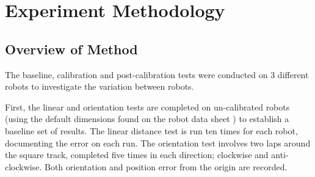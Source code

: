 \documentclass[conference]{IEEEtran}
\begin{document}
        
        

\section{Experiment Methodology}\label{sec:experiment_method}


\subsection{Overview of Method}

The baseline, calibration and post-calibration tests were conducted on 3 different robots to investigate the variation between robots. 

First, the linear and orientation tests are completed on un-calibrated robots (using the default dimensions found on the robot data sheet \cite{}) to establish a baseline set of results. 
The linear distance test is run ten times for each robot, documenting the error on each run. 
The orientation test involves two laps around the square track, completed five times in each direction; clockwise and anti-clockwise.
Both orientation and position error from the origin are recorded.
\end{document}
